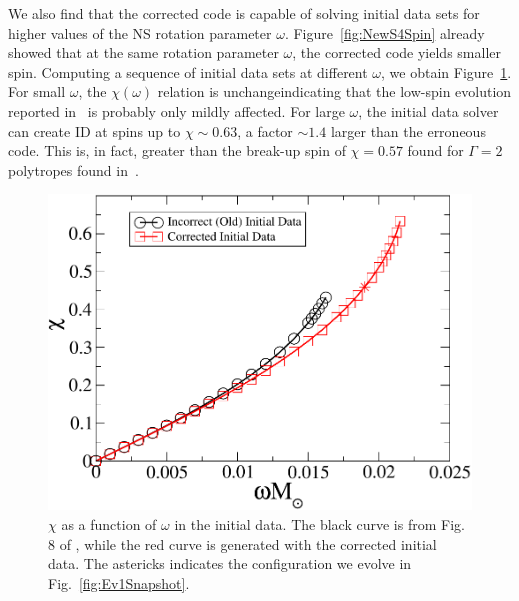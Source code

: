 \begin{subappendices}
We also find that the corrected code is capable of
  solving initial data sets for higher values of the NS rotation
  parameter $\omega$.  Figure~\ref{fig:NewS4Spin} already showed that
at the same rotation parameter $\omega$, the corrected code yields
smaller spin. Computing a sequence of initial data sets at different
$\omega$, we obtain Figure~\ref{fig:NewChiVOmega}.
For small $\omega$, the $\chi(\omega)$ relation is unchangeindicating that the low-spin evolution reported in~\cite{Tacik:2015tja} is probably only mildly affected.  For large $\omega$,
 the initial data solver can create ID at spins up to
$\chi\sim 0.63$, a factor $\sim 1.4$ larger than the erroneous code. This is, in fact, greater than the break-up spin of $\chi=0.57$
found for $\Gamma=2$ polytropes found in~\cite{Ansorg:2003br}.

\begin{figure}
\includegraphics[width=0.95\columnwidth]{chap2/NewChiVOmega}
\caption[$\chi$ vs. $\omega$ relation with corrected initial data.]{\label{fig:NewChiVOmega} $\chi$ as a function of $\omega$ in
  the initial data. The black curve is from Fig. 8 of
  \cite{Tacik:2015tja}, while the red curve is generated with the
  corrected initial data. The astericks indicates the configuration we
evolve in Fig.~\ref{fig:Ev1Snapshot}.}
\end{figure}


\end{subappendices}
